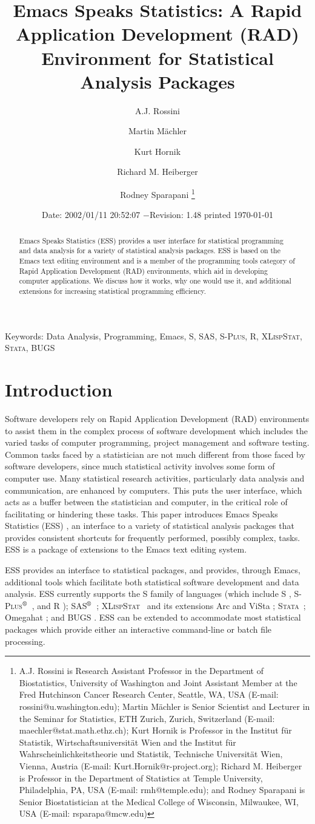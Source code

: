 \documentclass{article}
\title{Emacs Speaks Statistics:  A Rapid Application Development (RAD)
  Environment for Statistical Analysis Packages}
\author{A.J. Rossini \and Martin M{\"a}chler \and Kurt Hornik \and Richard
  M. Heiberger \and Rodney Sparapani \footnote{%
    A.J. Rossini is Research Assistant Professor in the Department of
    Biostatistics, University of Washington and Joint Assistant Member at
    the Fred Hutchinson Cancer Research Center, Seattle, WA, USA
    (E-mail: rossini@u.washington.edu);
    Martin M{\"a}chler is Senior Scientist and Lecturer in the Seminar for
    Statistics, ETH Zurich, Zurich, Switzerland
    (E-mail: maechler@stat.math.ethz.ch);
    Kurt Hornik is Professor in the Institut f{\"u}r Statistik,
    Wirtschaftsuniversit{\"a}t Wien and the Institut f{\"u}r
    Wahrscheinlichkeitstheorie und Statistik, Technische Universit{\"a}t
    Wien, Vienna, Austria (E-mail: Kurt.Hornik@r-project.org);
    Richard M. Heiberger is Professor in the Department of Statistics at
    Temple University, Philadelphia, PA, USA (E-mail: rmh@temple.edu);
    and Rodney Sparapani is Senior Biostatistician at the Medical College
    of Wisconsin, Milwaukee, WI, USA (E-mail: rsparapa@mcw.edu)}}
\date{$ $Date: 2002/01/11 20:52:07 $ - $Revision: 1.48 $ $\tiny printed \today}
\newif\ifdraft
\renewcommand{\baselinestretch}{1.5}
\newcommand*{\regstrd}{$^{\mbox{\scriptsize\textregistered}}$}
\newcommand*{\SAS}{\textsc{SAS}}
\newcommand*{\Splus}{\textsc{S-Plus}}
\newcommand*{\XLispStat}{\textsc{XLispStat}}
\newcommand*{\Stata}{\textsc{Stata}}
\begin{document}
\maketitle

\ifdraft{}%
\else%
 \renewcommand{\baselinestretch}{1.5}
\fi

\begin{abstract}
  Emacs Speaks Statistics (ESS) provides a user interface for
  statistical programming and data analysis for a variety
  of statistical analysis packages.  ESS
  is based on the Emacs text editing environment and is a member of
  the programming tools category of Rapid Application
  Development (RAD) environments, which aid in developing
  computer applications.  We discuss how it works, why one
  would use it, and additional extensions for increasing
  statistical programming efficiency.
\end{abstract}

\noindent Keywords: Data Analysis, Programming, Emacs, S, \SAS,
\Splus, R, \XLispStat, \Stata, BUGS


\section{Introduction}
\label{sec:introduction}

Software developers rely on Rapid Application Development (RAD)
environments to assist them in the complex process of software
development which includes the varied tasks of computer
programming, project management and software testing.
Common tasks faced by a statistician are not much different from those
faced by software developers, since much statistical
activity involves some form of computer use.  Many
statistical research activities, particularly data analysis and
communication, are enhanced by computers.  This puts the user
interface, which acts as a buffer between the statistician and
computer, in the critical role of facilitating or hindering these
tasks.  This paper introduces Emacs Speaks Statistics (ESS) \citep{ESS},
an interface to a variety of statistical analysis packages that
provides consistent shortcuts for frequently performed, possibly complex, tasks.
ESS is a package of extensions to the Emacs text editing system.

ESS provides an interface to statistical packages, and provides,
through Emacs, additional tools which facilitate both statistical
software development and data analysis.  ESS currently supports
the S family of languages (which include
S \citep{BecRCW88,ChaJH92,ChaJ98}, \Splus\regstrd\ \citep{Splus}, and R
\citep{ihak:gent:1996}); \SAS\regstrd\ \citep{SAS:8}; \XLispStat\
\citep{Tier90} and its extensions Arc \citep{Cook:Weisberg:1999} and
ViSta \citep{youn:fald:mcfa:1992}; \Stata\ \citep{Stata:6.0}; Omegahat
\citep{DTLang:2000}; and BUGS \citep{BUGS}.  ESS can be
extended to accommodate most statistical packages which provide either
an interactive command-line or batch file processing.
\end{document}
